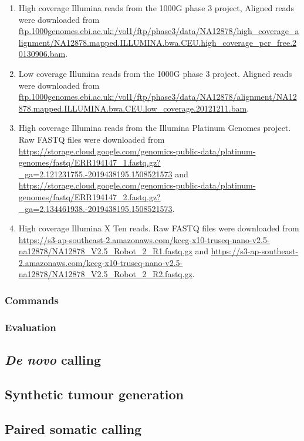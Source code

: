 \documentclass{article}
\begin{document}
\begin{enumerate}
    \item High coverage Illumina reads from the 1000G phase 3 project, Aligned reads were downloaded from \url{ftp.1000genomes.ebi.ac.uk:/vol1/ftp/phase3/data/NA12878/high_coverage_alignment/NA12878.mapped.ILLUMINA.bwa.CEU.high_coverage_pcr_free.20130906.bam}.
    \item Low coverage Illumina reads from the 1000G phase 3 project. Aligned reads were downloaded from \url{ftp.1000genomes.ebi.ac.uk:/vol1/ftp/phase3/data/NA12878/alignment/NA12878.mapped.ILLUMINA.bwa.CEU.low_coverage.20121211.bam}.
    \item High coverage Illumina reads from the Illumina Platinum Genomes project. Raw FASTQ files were downloaded from \url{https://storage.cloud.google.com/genomics-public-data/platinum-genomes/fastq/ERR194147_1.fastq.gz?_ga=2.121231755.-2019438195.1508521573} and \url{https://storage.cloud.google.com/genomics-public-data/platinum-genomes/fastq/ERR194147_2.fastq.gz?_ga=2.134461938.-2019438195.1508521573}.
    \item High coverage Illumina X Ten reads. Raw FASTQ files were downloaded from \url{https://s3-ap-southeast-2.amazonaws.com/kccg-x10-truseq-nano-v2.5-na12878/NA12878_V2.5_Robot_2_R1.fastq.gz} and \url{https://s3-ap-southeast-2.amazonaws.com/kccg-x10-truseq-nano-v2.5-na12878/NA12878_V2.5_Robot_2_R2.fastq.gz}.
\end{enumerate}

\subsubsection{Commands}

\subsubsection{Evaluation}

\subsection{\textit{De novo} calling}

\subsection{Synthetic tumour generation}

\subsection{Paired somatic calling}
\end{document}
